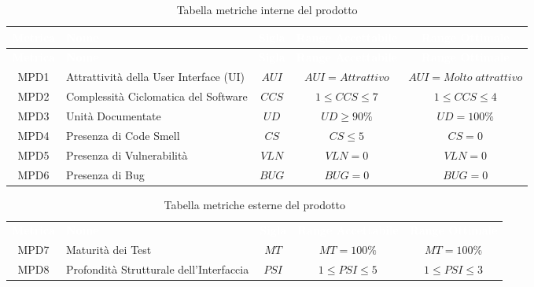 \renewcommand{\arraystretch}{1.5}
\begin{longtable}{ c C{4cm} c c c}
\caption{Tabella metriche interne del prodotto}\\
\textcolor{white}{\textbf{Metrica}} & \textcolor{white}{\textbf{Nome}} & \textcolor{white}{\textbf{Sigla}} & \textcolor{white}{\textbf{Range Accettabile}} & \textcolor{white}{\textbf{Range Ottimale}}\\
\endfirsthead
{}
\textcolor{white}{\textbf{Metrica}} & \textcolor{white}{\textbf{Nome}} & \textcolor{white}{\textbf{Sigla}} & \textcolor{white}{\textbf{Range Accettabile}} & \textcolor{white}{\textbf{Range Ottimale}}\\
\endhead

    MPD1 & Attrattività della User Interface (UI) & $AUI$ & $AUI = Attrattivo$ &  $AUI = Molto \; attrattivo$\\
    MPD2 & Complessità Ciclomatica del Software & $CCS $ & $1 \leq CCS \leq 7 $ & $1 \leq CCS \leq 4$\\
    MPD3 & Unità Documentate & $UD$ & $UD \geq 90\%$ & $UD = 100\%$\\
    MPD4 & Presenza di Code Smell & $CS$ & $CS \leq 5 $ & $CS = 0 $\\
    MPD5 & Presenza di Vulnerabilità & $VLN$ & $VLN = 0$ & $VLN = 0 $\\
    MPD6 & Presenza di Bug & $BUG$ & $BUG = 0 $ & $BUG = 0 $\\
    
\end{longtable} 
\newpage
{}
\renewcommand{\arraystretch}{1.5}
\begin{longtable}{ c C{4cm} c c c}
\caption{Tabella metriche esterne del prodotto}\\
\textcolor{white}{\textbf{Metrica}} & \textcolor{white}{\textbf{Nome}} & \textcolor{white}{\textbf{Sigla}} & \textcolor{white}{\textbf{Range Accettabile}} & \textcolor{white}{\textbf{Range Ottimale}}\\
    MPD7 & Maturità dei Test & $MT$ & $MT = 100\%$ & $MT = 100\%$\\
    MPD8 & Profondità Strutturale dell'Interfaccia & $PSI$ & $1 \leq PSI \leq 5$ &$1 \leq PSI \leq 3$\\
\end{longtable}
